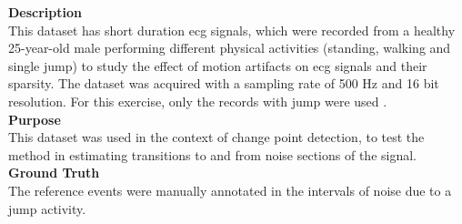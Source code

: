 \textbf{Description}\hfill\\
This dataset has short duration \gls{ecg} signals, which were recorded from a healthy 25-year-old male performing different physical activities (standing, walking and single jump) to study the effect of motion artifacts on \gls{ecg} signals and their sparsity. The dataset was acquired with a sampling rate of 500 Hz and 16 bit resolution. For this exercise, only the records with jump were used \cite{dataset7, PhysioNet}.\\
\textbf{Purpose}\hfill\\
This dataset was used in the context of change point detection, to test the method in estimating transitions to and from noise sections of the signal.\\
\textbf{Ground Truth}\\
The reference events were manually annotated in the intervals of noise due to a jump activity.

%
%

